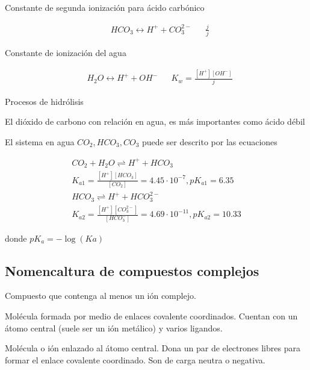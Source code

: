 Constante de segunda ionización para ácido carbónico

\begin{align}
	 & HCO_3\longleftrightarrow H^+ +CO_3^{2-} &  & \frac{j}{j}
\end{align}

Constante de ionización del agua

\begin{align}
	 & H_2O\longleftrightarrow H^+ +OH^- &  & K_w=\frac{\left[ H^+\right]\left[ OH^-\right]}{j}
\end{align}

Procesos de hidrólisis

El dióxido de carbono con relación en agua, es más importantes como ácido débil

El sistema en agua $CO_2,HCO_3,CO_3$ puede ser descrito por las ecuaciones

\begin{align}
	CO_2+H_2O \rightleftharpoons H^+ +HCO_3                                                              \\
	K_{a1}=\frac{\left[H^+\right] \left[HCO_3\right]}{\left[CO_2\right]}=4.45\cdot 10^{-7}, pK_{a1}=6.35 \\
	HCO_3 \rightleftharpoons H^+ +HCO_3^{2-}                                                             \\
	K_{a2}=\frac{\left[H^+\right]\left[CO_3^{2-}\right] }{\left[HCO_3^{-}\right] }=4.69\cdot 10^{-11},pK_{a2}=10.33
\end{align}

donde $pK_{a}=-\log(Ka)$

\subsection{Nomencaltura de compuestos complejos}

\begin{definition}
	Compuesto que contenga al menos un ión complejo.
\end{definition}


\begin{definition}
	Molécula formada por medio de enlaces covalente
	coordinados. Cuentan con un átomo central (suele ser un ión metálico) y varios
	ligandos.
\end{definition}

\begin{definition}[Ligando]
	Molécula o ión enlazado al átomo central. Dona un par de electrones libres
	para formar el enlace covalente coordinado. Son de carga neutra o negativa.
\end{definition}


